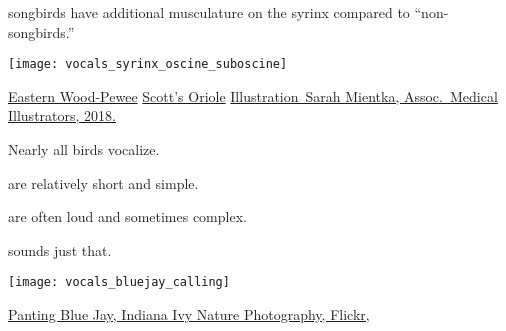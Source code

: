 \documentclass[t]{beamer}
\newcommand{\backskip}{\vspace{-0.5\baselineskip}}
\begin{document}

\begin{frame}{ songbirds have additional musculature on the syrinx compared to “non-songbirds.”}

\backskip
\centering
\texttt{[image: vocals\_syrinx\_oscine\_suboscine]}

\vfilll

\tiny \href{https://youtu.be/cOi35DdUNS4}{Eastern Wood-Pewee}
\quad
\href{https://macaulaylibrary.org/asset/112641}{Scott's Oriole} 
\hfill 
\href{https://meetings.ami.org/2018/project/syrinx-musculature-compared-in-oscine-vs-suboscine-passerines/}{Illustration \textcopyright\,Sarah Mientka, Assoc.~Medical Illustrators, 2018.}
\end{frame}


\begin{frame}{Nearly all birds vocalize.}

\begin{multicols}{2}

\hangpara {} are relatively short and simple.

\hangpara {} are often loud and sometimes complex.

\hangpara {} sounds just that.

\columnbreak


\noindent \texttt{[image: vocals\_bluejay\_calling]}
\end{multicols}

\vfilll

\tinyfill \href{https://www.flickr.com/photos/98774255@N00/5925119364}{Panting Blue Jay, Indiana Ivy Nature Photography, Flickr, }

\end{frame}
\end{document}
